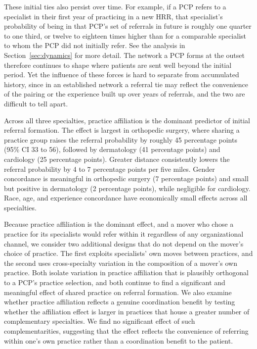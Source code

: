 \documentclass[12pt]{article}
\begin{document}
These initial ties also persist over time. For example, if a PCP refers to a specialist in their first year of practicing in a new HRR, that specialist's probability of being in that PCP's set of referrals in future is roughly one quarter to one third, or twelve to eighteen times higher than for a comparable specialist to whom the PCP did not initially refer. See the analysis in Section~\ref{sec:dynamics} for more detail. The network a PCP forms at the outset therefore continues to shape where patients are sent well beyond the initial period. Yet the influence of these forces is hard to separate from accumulated history, since in an established network a referral tie may reflect the convenience of the pairing or the experience built up over years of referrals, and the two are difficult to tell apart.

Across all three specialties, practice affiliation is the dominant predictor of initial referral formation. The effect is largest in orthopedic surgery, where sharing a practice group raises the referral probability by roughly 45 percentage points (95\% CI 33 to 56), followed by dermatology (41 percentage points) and cardiology (25 percentage points). Greater distance consistently lowers the referral probability by 4 to 7 percentage points per five miles. Gender concordance is meaningful in orthopedic surgery (7 percentage points) and small but positive in dermatology (2 percentage points), while negligible for cardiology. Race, age, and experience concordance have economically small effects across all specialties.

Because practice affiliation is the dominant effect, and a mover who chose a practice for its specialists would refer within it regardless of any organizational channel, we consider two additional designs that do not depend on the mover's choice of practice. The first exploits specialists' own moves between practices, and the second uses cross-specialty variation in the composition of a mover's own practice. Both isolate variation in practice affiliation that is plausibly orthogonal to a PCP's practice selection, and both continue to find a significant and meaningful effect of shared practice on referral formation. We also examine whether practice affiliation reflects a genuine coordination benefit by testing whether the affiliation effect is larger in practices that house a greater number of complementary specialties. We find no significant effect of such complementarities, suggesting that the effect reflects the convenience of referring within one's own practice rather than a coordination benefit to the patient.
\end{document}
